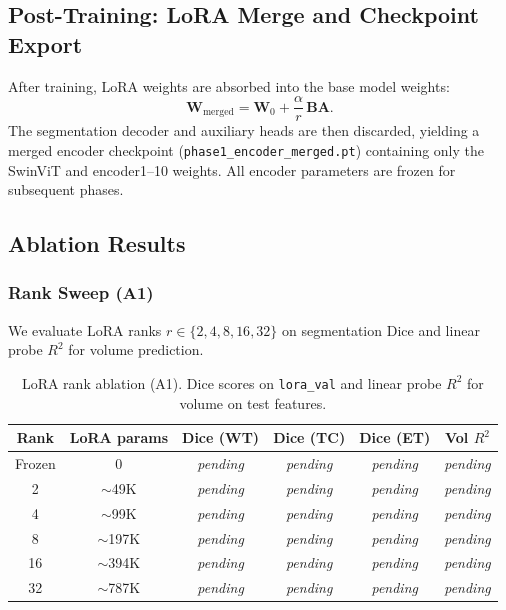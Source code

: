 \subsection{Post-Training: LoRA Merge and Checkpoint Export}
\label{sec:lora:merge}

After training, LoRA weights are absorbed into the base model weights:
\begin{equation}
  \mathbf{W}_{\text{merged}} = \mathbf{W}_0 + \frac{\alpha}{r}\,
    \mathbf{B}\mathbf{A}.
  \label{eq:lora_merge}
\end{equation}
The segmentation decoder and auxiliary heads are then discarded, yielding a
merged encoder checkpoint (\texttt{phase1\_encoder\_merged.pt}) containing
only the SwinViT and encoder1--10 weights. All encoder parameters are frozen
for subsequent phases.

\subsection{Ablation Results}
\label{sec:lora:ablation}

\subsubsection{Rank Sweep (A1)}

We evaluate LoRA ranks $r \in \{2, 4, 8, 16, 32\}$ on segmentation Dice
and linear probe $R^2$ for volume prediction.

\begin{table}[H]
  \centering
  \caption{LoRA rank ablation (A1). Dice scores on \texttt{lora\_val} and
    linear probe $R^2$ for volume on test features.}
  \label{tab:rank_ablation}
  \begin{tabular}{cccccc}
    \toprule
    \textbf{Rank} & \textbf{LoRA params} & \textbf{Dice (WT)} &
      \textbf{Dice (TC)} & \textbf{Dice (ET)} & \textbf{Vol $R^2$} \\
    \midrule
    Frozen & 0 & \textit{pending} & \textit{pending} & \textit{pending} & \textit{pending} \\
    2  & $\sim$49K  & \textit{pending} & \textit{pending} & \textit{pending} & \textit{pending} \\
    4  & $\sim$99K  & \textit{pending} & \textit{pending} & \textit{pending} & \textit{pending} \\
    8  & $\sim$197K & \textit{pending} & \textit{pending} & \textit{pending} & \textit{pending} \\
    16 & $\sim$394K & \textit{pending} & \textit{pending} & \textit{pending} & \textit{pending} \\
    32 & $\sim$787K & \textit{pending} & \textit{pending} & \textit{pending} & \textit{pending} \\
    \bottomrule
  \end{tabular}
\end{table}

